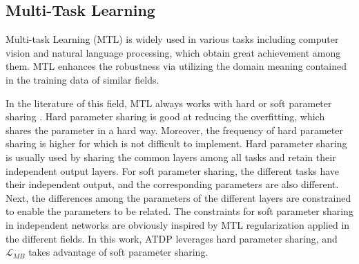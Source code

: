 \documentclass[journal,transmag]{IEEEtran}
\begin{document}
\subsection{Multi-Task Learning}
Multi-task Learning (MTL) \cite{zhang2017survey} is widely used in various tasks including computer vision and natural language processing, which obtain great achievement among them. 
MTL enhances the robustness via utilizing the domain meaning contained in the training data of similar fields.


In the literature of this field, MTL always works with hard or soft parameter sharing \cite{caruana1993multitask,duong2015low}.
Hard parameter sharing is good at reducing the overfitting, which shares the parameter in a hard way.
Moreover, the frequency of hard parameter sharing is higher for which is not difficult to implement.
Hard parameter sharing is usually used by sharing the common layers among all tasks and retain their independent output layers.
For soft parameter sharing, the different tasks have their independent output, and the corresponding parameters are also different.
Next, the differences among the parameters of the different layers are constrained to enable the parameters to be related. 
The constraints for soft parameter sharing in independent networks are obviously inspired by MTL regularization applied in the different fields.
In this work, ATDP leverages hard parameter sharing, and $\mathcal{L}_{MB}$ takes advantage of soft parameter sharing.
\end{document}

